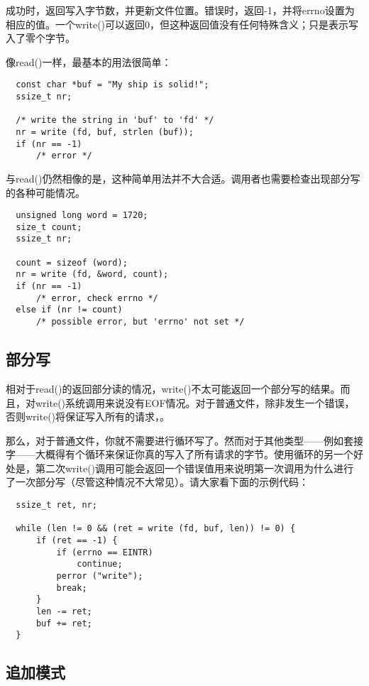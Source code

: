 成功时，返回写入字节数，并更新文件位置。错误时，返回-1，并将errno设置为相应的值。一个write()可以返回0，但这种返回值没有任何特殊含义；只是表示写入了零个字节。

像read()一样，最基本的用法很简单： 

\begin{lstlisting}
  const char *buf = "My ship is solid!";
  ssize_t nr;
 
  /* write the string in 'buf' to 'fd' */
  nr = write (fd, buf, strlen (buf));
  if (nr == -1)
      /* error */
\end{lstlisting}

与read()仍然相像的是，这种简单用法并不大合适。调用者也需要检查出现部分写的各种可能情况。

\begin{lstlisting}
  unsigned long word = 1720;
  size_t count;
  ssize_t nr;

  count = sizeof (word);
  nr = write (fd, &word, count);
  if (nr == -1)
      /* error, check errno */
  else if (nr != count)
      /* possible error, but 'errno' not set */
\end{lstlisting}

\subsection{部分写}

相对于read()的返回部分读的情况，write()不太可能返回一个部分写的结果。而且，对write()系统调用来说没有EOF情况。对于普通文件，除非发生一个错误，否则write()将保证写入所有的请求，。

那么，对于普通文件，你就不需要进行循环写了。然而对于其他类型——例如套接字——大概得有个循环来保证你真的写入了所有请求的字节。使用循环的另一个好处是，第二次write()调用可能会返回一个错误值用来说明第一次调用为什么进行了一次部分写（尽管这种情况不大常见）。请大家看下面的示例代码：

\begin{lstlisting}
  ssize_t ret, nr;

  while (len != 0 && (ret = write (fd, buf, len)) != 0) {
      if (ret == -1) {
          if (errno == EINTR)
              continue;
          perror ("write");
          break;
      }
      len -= ret;
      buf += ret;
  }
\end{lstlisting}

\subsection{追加模式}


